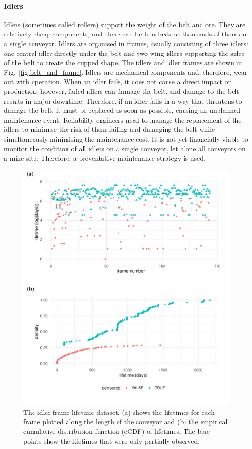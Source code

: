 \paragraph*{Idlers}

Idlers (sometimes called rollers) support the weight of the belt and ore. They are relatively cheap components, and there can be hundreds or thousands of them on a single conveyor. Idlers are organised in frames, usually consisting of three idlers: one central idler directly under the belt and two wing idlers supporting the sides of the belt to create the cupped shape. The idlers and idler frames are shown in Fig.~\ref{fig:belt_and_frame}. Idlers are mechanical components and, therefore, wear out with operation. When an idler fails, it does not cause a direct impact on production; however, failed idlers can damage the belt, and damage to the belt results in major downtime. Therefore, if an idler fails in a way that threatens to damage the belt, it must be replaced as soon as possible, causing an unplanned maintenance event. Reliability engineers need to manage the replacement of the idlers to minimise the risk of them failing and damaging the belt while simultaneously minimising the maintenance cost. It is not yet financially viable to monitor the condition of all idlers on a single conveyor, let alone all conveyors on a mine site. Therefore, a preventative maintenance strategy is used.

\begin{figure}
  \centering
  \includegraphics[width=1\textwidth]{./figures/ch-1/idler_data_desc.pdf}
  \caption{The idler frame lifetime dataset. (a) shows the lifetimes for each frame plotted along the length of the conveyor and (b) the empirical cumulative distribution function (eCDF) of lifetimes. The blue points show the lifetimes that were only partially observed.}
  \label{fig:idler-data}
\end{figure}


